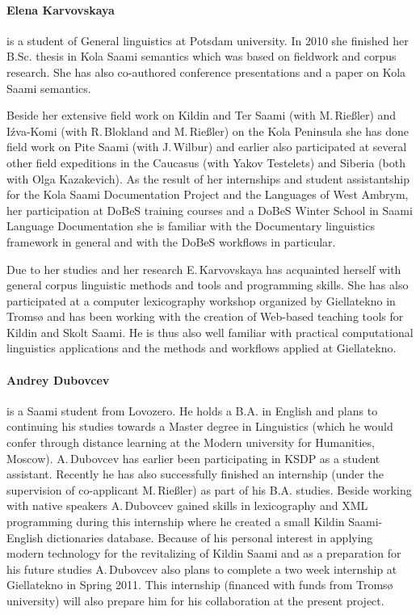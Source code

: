 \documentclass[a4paper,12pt]{article}
\begin{document}
{{{{\paragraph{Elena Karvovskaya} is a student of General linguistics at Potsdam university. In 2010 she finished her B.Sc. thesis in Kola Saami semantics which was based on fieldwork and corpus research. She has also co-authored conference presentations and a paper on Kola Saami semantics.

Beside her extensive field work on Kildin and Ter Saami (with M.\,Rießler) and Iźva-Komi (with R.\,Blokland and M.\,Rießler) on the Kola Peninsula she has done field work on Pite Saami (with J.\,Wilbur) and earlier also participated at several other field expeditions in the Caucasus (with Yakov Testelets) and Siberia (both with Olga Kazakevich). As the result of her internships and student assistantship for the Kola Saami Documentation Project and the Languages of West Ambrym, her participation at DoBeS training courses and a DoBeS Winter School in Saami Language Documentation she is familiar with the Documentary linguistics framework in general and with the DoBeS workflows in particular.

Due to her studies and her research E.\,Karvovskaya has acquainted herself with general corpus linguistic methods and tools and programming skills. She has also participated at a computer lexicography workshop organized by Giellatekno in Tromsø and has been working with the creation of Web-based teaching tools for Kildin and Skolt Saami. He is thus also well familiar with practical computational linguistics applications and the methods and workflows applied at Giellatekno.

\paragraph{Andrey Dubovcev} is a Saami student from Lovozero. He holds a B.A. in English and plans to continuing his studies towards a Master degree in Linguistics (which he would confer through distance learning at the Modern university for Humanities, Moscow). A.\,Dubovcev has earlier been participating in KSDP as a student assistant. Recently he has also successfully finished an internship (under the supervision of co-applicant M.\,Rießler) as part of his B.A. studies. Beside working with native speakers A.\,Dubovcev gained skills in lexicography and XML programming during this internship where he created a small Kildin Saami-English dictionaries database. Because of his personal interest in applying modern technology for the revitalizing of Kildin Saami and as a preparation for his future studies A.\,Dubovcev also plans to complete a two week internship at Giellatekno in Spring 2011. This internship (financed with funds from Tromsø university) will also prepare him for his collaboration at the present  project.

}}}}
\end{document}
